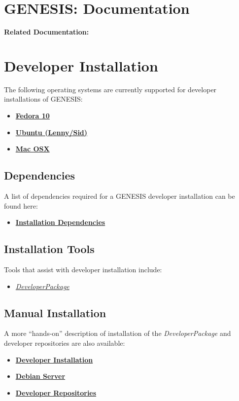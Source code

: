 \documentclass[12pt]{article}
\begin{document}
\section*{GENESIS: Documentation}

{\bf Related Documentation:}

\section*{Developer Installation}

The following operating systems are currently supported for developer installations of GENESIS:

\begin{itemize}
   \item[]\href{../installation-fedora10/installation-fedora10.tex}{\bf Fedora 10}
   \item[]\href{../installation-ubuntu-lennysid/installation-ubuntu-lennysid.tex}{\bf Ubuntu (Lenny/Sid)}
   \item[]\href{../installation-osx/installation-osx.tex}{\bf Mac OSX}
\end{itemize}

\subsection*{Dependencies}
A list of dependencies required for a GENESIS developer installation can be found here:
\begin{itemize}
   \item[]\href{../genesis-dependencies/genesis-dependencies.tex}{\bf Installation Dependencies}
\end{itemize}

\subsection*{Installation Tools}
Tools that assist with developer installation include:
\begin{itemize}
   \item[]\href{../developer-package/developer-package.tex}{\it DeveloperPackage}
\end{itemize}

\subsection*{Manual Installation}
A more ``hands-on'' description of installation of the {\it DeveloperPackage} and developer repositories are also available:
\begin{itemize}
   \item \href{../installation-developer/installation-developer.tex}{\bf Developer Installation}
   \item \href{../installation-debian-server/installation-debian-server.tex}{\bf Debian Server}
   \item \href{../developer-repository/developer-repository.tex}{\bf Developer Repositories}
\end{itemize}
\end{document}
